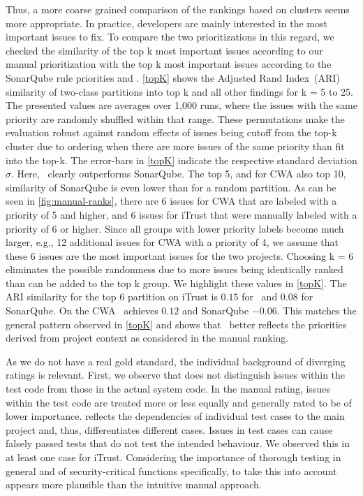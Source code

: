 Thus, a more coarse grained comparison of the rankings based on clusters seems more appropriate.
In practice, developers are mainly interested in the most important issues to fix. To compare the two prioritizations in this regard, we checked %
the similarity
of the top k most important issues according to our manual prioritization %
with
the top k most important issues according to the SonarQube rule priorities and \appr.
\autoref{topK} shows the Adjusted Rand Index~(ARI)\,\cite{Hubert1985,Santos2009} similarity of two-class partitions into top k and all other findings for k = 5 to 25.
The presented values are averages over 1,000 runs, where the issues with the same priority are randomly shuffled within that range.
These permutations make the evaluation robust against random effects of issues %
being cutoff from the top-k cluster due to ordering when there are more issues of the same priority than fit into the top-k.
The error-bars in \autoref{topK} indicate the respective standard deviation $\sigma$.
Here,  \appr\ clearly outperforms SonarQube.
The top 5, and for CWA also top 10, similarity of SonarQube is even lower than for a random partition.
As can be seen in \autoref{fig:manual-ranks}, there are 6 issues for CWA that are labeled with a priority of 5 and higher, and 6 issues for iTrust that were manually labeled with a priority of 6 or higher.
Since all groups with lower priority labels become much larger, e.g., 12 additional issues for CWA with a priority of 4, we assume that these 6 issues are the most important issues for the two projects. %
Choosing k = 6
eliminates the possible randomness due to more issues being identically ranked than can be added to the top k group.
We highlight these values in \autoref{topK}.
The ARI similarity for the top 6 partition on iTrust is $0.15$ for \appr\ and $0.08$ for SonarQube.
On the CWA \appr\  achieves $0.12$ and SonarQube $-0.06$.
This matches the general pattern observed in \autoref{topK} and shows that \appr\ better reflects the priorities derived from project context as considered in the manual ranking.

As we do not have a real gold standard, the individual background of diverging ratings is relevant.
First, we observe that \appr{} does not distinguish issues within the test code from those in the actual system code.
In the manual rating, issues within the test code are treated more or less equally and generally rated to be of lower importance.
\appr{} reflects the dependencies of individual test cases to the main project and, thus, differentiates different cases.
Issues in test cases can cause falsely passed tests that do not test the intended behaviour.
We observed this in at least one case for iTrust.
Considering the importance of thorough testing in general and of security-critical functions specifically, to take this into account appears more plausible than the intuitive manual approach.


